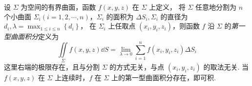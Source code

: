 \begin{definition}
    设 $ \varSigma $ 为空间的有界曲面，函数 $ f(x, y, z) $ 在 $ \varSigma $ 上定义，
    将 $ \varSigma $ 任意地分割为 $ n $ 个小曲面 $ \varSigma_{i}(i=1,2, \cdots, n)$，$\varSigma_{i} $ 的面积为 $ \Delta S_{i}, \varSigma_{i} $ 的直径为 $ \displaystyle d_{i}, \lambda=\max _{1 \leqslant i \leqslant n}\left\{d_{i}\right\} $，
    在 $ \varSigma_{i} $ 上任取点 $ \left(x_{i}, y_{i}, z_{i}\right) $，则函数 $ f $ 沿 $ \varSigma $ 的\textit{第一型曲面积分}定义为
    $$\iint\limits_{\varSigma} f(x, y, z) \dd S = \lim _{\lambda \rightarrow 0} \sum_{i=1}^{n} f\left(x_{i}, y_{i}, z_{i}\right) \Delta S_{i}$$
    这里右端的极限存在，且与分割 $ \varSigma $ 的方式无关，与点 $ \left(x_{i}, y_{i}, z_{i}\right) $ 的取法无关.
    当 $ f(x, y, z) $ 在 $ \varSigma $ 上连续时，$f $ 在 $ \varSigma $ 上的第一型曲面积分存在，即可积.
\end{definition}
